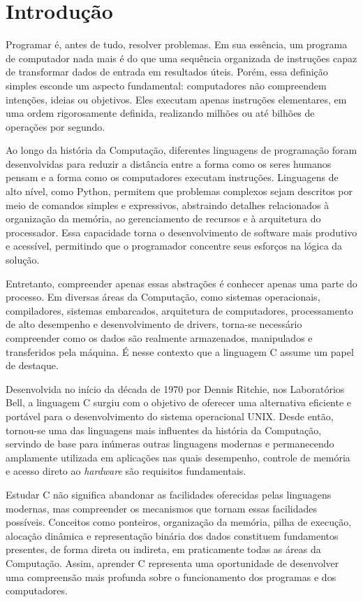\documentclass[12pt,a4paper,oneside]{extreport}
\begin{document}
\chapter{Introdução}

Programar é, antes de tudo, resolver problemas. Em sua essência, um programa de computador nada mais é do que uma sequência organizada de instruções capaz de transformar dados de entrada em resultados úteis. Porém, essa definição simples esconde um aspecto fundamental: computadores não compreendem intenções, ideias ou objetivos. Eles executam apenas instruções elementares, em uma ordem rigorosamente definida, realizando milhões ou até bilhões de operações por segundo.

Ao longo da história da Computação, diferentes linguagens de programação foram desenvolvidas para reduzir a distância entre a forma como os seres humanos pensam e a forma como os computadores executam instruções. Linguagens de alto nível, como Python, permitem que problemas complexos sejam descritos por meio de comandos simples e expressivos, abstraindo detalhes relacionados à organização da memória, ao gerenciamento de recursos e à arquitetura do processador. Essa capacidade torna o desenvolvimento de software mais produtivo e acessível, permitindo que o programador concentre seus esforços na lógica da solução.

Entretanto, compreender apenas essas abstrações é conhecer apenas uma parte do processo. Em diversas áreas da Computação, como sistemas operacionais, compiladores, sistemas embarcados, arquitetura de computadores, processamento de alto desempenho e desenvolvimento de drivers, torna-se necessário compreender como os dados são realmente armazenados, manipulados e transferidos pela máquina. É nesse contexto que a linguagem C assume um papel de destaque.

Desenvolvida no início da década de 1970 por Dennis Ritchie, nos Laboratórios Bell, a linguagem C surgiu com o objetivo de oferecer uma alternativa eficiente e portável para o desenvolvimento do sistema operacional UNIX. Desde então, tornou-se uma das linguagens mais influentes da história da Computação, servindo de base para inúmeras outras linguagens modernas e permanecendo amplamente utilizada em aplicações nas quais desempenho, controle de memória e acesso direto ao \textit{hardware} são requisitos fundamentais.

Estudar C não significa abandonar as facilidades oferecidas pelas linguagens modernas, mas compreender os mecanismos que tornam essas facilidades possíveis. Conceitos como ponteiros, organização da memória, pilha de execução, alocação dinâmica e representação binária dos dados constituem fundamentos presentes, de forma direta ou indireta, em praticamente todas as áreas da Computação. Assim, aprender C representa uma oportunidade de desenvolver uma compreensão mais profunda sobre o funcionamento dos programas e dos computadores.
\end{document}
